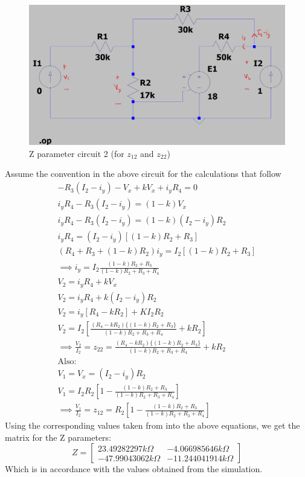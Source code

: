 \documentclass[titlepage]{article}
\begin{document}
\begin{figure}[ht]
    \centering
    \includegraphics[scale=0.25]{resources/zparams2.png}
    \caption{Z parameter circuit 2 (for $z_{12}$ and $z_{22}$)}
\end{figure}
Assume the convention in the above circuit for the calculations that follow
\begin{gather*}
    -R_3(I_2-i_y)-V_x+kV_x+i_yR_4=0\\
    i_yR_4-R_3(I_2-i_y)=(1-k)V_x\\
    i_yR_4-R_3(I_2-i_y)=(1-k)(I_2-i_y)R_2\\
    i_yR_4=(I_2-i_y)[(1-k)R_2+R_3]\\
    (R_4+R_3+(1-k)R_2)i_y=I_2[(1-k)R_2+R_3]\\
    \implies i_y=I_2\frac{(1-k)R_2+R_3}{(1-k)R_2+R_3+R_4}\\
    V_2=i_yR_4+kV_x\\
    V_2=i_yR_4+k(I_2-i_y)R_2\\
    V_2=i_y[R_4-kR_2]+KI_2R_2\\
    V_2=I_2\left[\frac{(R_4-kR_2)\{(1-k)R_2+R_3\}}{(1-k)R_2+R_3+R_4}+kR_2\right]\\
    \implies \frac{V_2}{I_2} = \boxed{z_{22} = \frac{(R_4-kR_2)\{(1-k)R_2+R_3\}}{(1-k)R_2+R_3+R_4}+kR_2}\\
    \mathrm{Also:} \\
    V_1=V_x=(I_2-i_y)R_2\\
    V_1=I_2R_2\left[1-\frac{(1-k)R_2+R_3}{(1-k)R_2+R_3+R_4}\right]\\
    \implies \frac{V_1}{I_2} = \boxed{z_{12} = R_2\left[1-\frac{(1-k)R_2+R_3}{(1-k)R_2+R_3+R_4}\right]}
\end{gather*}
\newpage
Using the corresponding values taken from  into the above equations, we get the matrix for the Z parameters:
$$ Z = \begin{bmatrix}
        23.49282297k\Omega  & -4.066985646k\Omega  \\
        -47.99043062k\Omega & -11.244041914k\Omega
    \end{bmatrix}
$$
Which is in accordance with the values obtained from the simulation.
\end{document}
